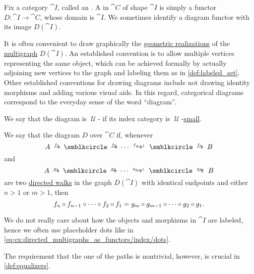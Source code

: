 \begin{definition}\label{def:categorical_diagram}
  Fix a category \( \cat{I} \), called an . A  in \( \cat{C} \) of shape \( \cat{I} \) is simply a functor \( D: \cat{I} \to \cat{C} \), whose domain is \( \cat{I} \). We sometimes identify a diagram functor with its image \( D(\cat{I}) \).

  It is often convenient to draw graphically the \hyperref[def:graph_geometric_realization]{geometric realizations} of the \hyperref[def:directed_multigraph]{multigraph} \( D(\cat{I}) \). An established convention is to allow multiple vertices representing the same object, which can be achieved formally by actually adjoining new vertices to the graph and labeling them as in \cref{def:labeled_set}. Other established conventions for drawing diagrams include not drawing identity morphisms and adding various visual aids. In this regard, categorical diagrams correspond to the everyday sense of the word \enquote{diagram}.

  We say that the diagram is \( \mscrU \)- if its index category is \( \mscrU \)-\hyperref[def:category_size]{small}.

  We say that the diagram \( D \) over \( \cat{C} \)  if, whenever
  \begin{equation*}
    A \reloset {f_1} \to \anon \reloset {f_2} \to \cdots \reloset {f_{n-1}} \to \anon \reloset {f_n} \to B
  \end{equation*}
  and
  \begin{equation*}
    A \reloset {g_1} \to \anon \reloset {g_2} \to \cdots \reloset {g_{n-1}} \to \anon \reloset {g_m} \to B
  \end{equation*}
  are two \hyperref[def:graph_walk/directed]{directed walks} in the graph \( D(\cat{I}) \) with identical endpoints and either \( n > 1 \) or \( m > 1 \), then
  \begin{equation*}
    f_n \bincirc f_{n-1} \bincirc \cdots \bincirc f_2 \bincirc f_1
    =
    g_m \bincirc g_{m-1} \bincirc \cdots \bincirc g_2 \bincirc g_1.
  \end{equation*}

  We do not really care about how the objects and morphisms in \( \cat{I} \) are labeled, hence we often use placeholder dots like in \eqref{eq:ex:directed_multigraphs_as_functors/index/dots}.

  The requirement that the one of the paths is nontrivial, however, is crucial in \cref{def:equalizers}.
\end{definition}

